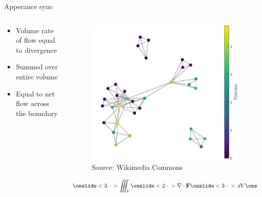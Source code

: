 \documentclass{beamer}
\begin{document}
\begin{frame}{Apperance sync}
    \begin{columns}

        \begin{column}{0.6\textwidth}
            \begin{itemize}
                \item<2-> Volume rate of flow equal to divergence
                \item<3-> Summed over entire volume
                \item<4-> Equal to net flow across the boundary
            \end{itemize}
        \end{column}

        \begin{column}{0.4\textwidth}
            \begin{figure}
                \centering
                    \includegraphics[width=\textwidth]{../Figures/problemGraph.pdf}
                    \caption{Source: Wikimedia Commons}
            \end{figure}
            \begin{equation*}
                \onslide<3->{\iiint_V}\onslide<2->{\nabla\cdot\textbf{F}}\onslide<3->{\,dV}\onslide<4->{=\oiint_A \textbf{F}\cdot d\textbf{A}}
            \end{equation*}
        \end{column}

    \end{columns}
\end{frame}
\end{document}

